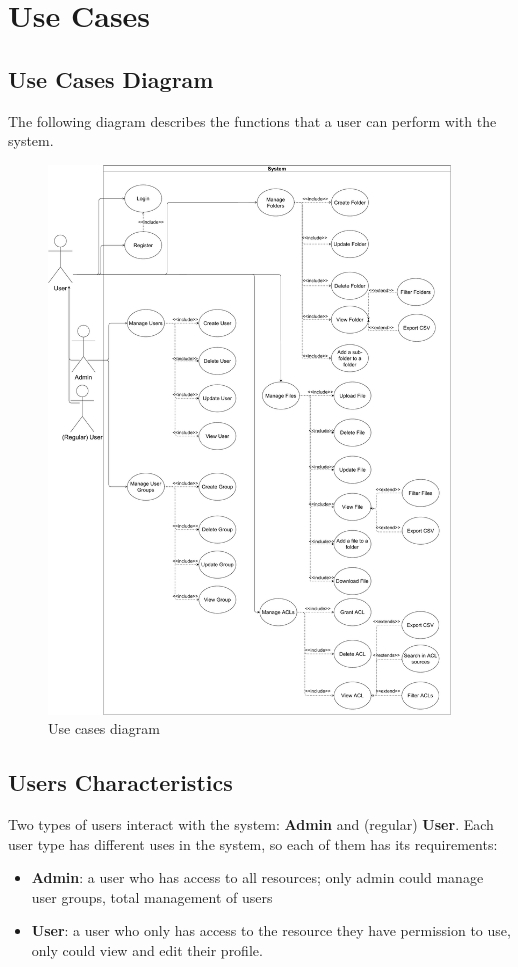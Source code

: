 \section{Use Cases}
\subsection{Use Cases Diagram}
The following diagram describes the functions that a user can perform with the system.
\begin{figure}[H]
    \centering
    \includegraphics[width=0.95\textwidth]{images/Use_case_diagram_Top_level_All.pdf}
    \caption{Use cases diagram}
    \label{fig:description}
\end{figure}
\subsection{Users Characteristics}
Two types of users interact with the system: \textbf{Admin} and (regular) \textbf{User}. Each user type has different uses in the system, so each of them has its requirements:
\begin{itemize}
    \item \textbf{Admin}: a user who has access to all resources; only admin could manage user groups, total management of users
    \item \textbf{User}: a user who only has access to the resource they have permission to use, only could view and edit their profile.
\end{itemize}

